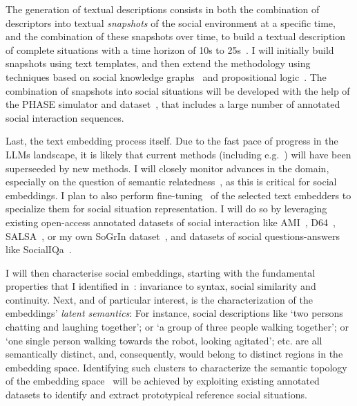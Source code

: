 
The generation of textual descriptions consists in both the combination of
descriptors into textual \emph{snapshots} of the social environment at a
specific time, and the combination of these snapshots over time, to build a
textual description of complete situations with a time horizon of 10s to
25s~\cite{netanyahu2021phase}. I will initially build snapshots using text
templates, and then extend the methodology using techniques based on
social knowledge graphs~\cite{sap2019atomic} and propositional
logic~\cite{tsoi2022sean}. The combination of snapshots into social situations
will be developed with the help of the PHASE simulator and
dataset~\cite{netanyahu2021phase}, that includes a large number of annotated
social interaction sequences.

Last, the text embedding process itself. Due to the fast pace of progress in the
LLMs landscape, it is likely that current
methods (including e.g.~\cite{reimers2019sentencebert,muennighoff2022sgpt}) will
have been superseeded by new methods. I will closely monitor
advances in the domain, especially on the question of semantic
relatedness~\cite{thakur2021beir}, as this is critical for social
embeddings. I plan to also perform fine-tuning~\cite{hadsell2006dimensionality}
of the selected text embedders to specialize them for social situation
representation. I will do so by leveraging existing open-access annotated
datasets of social interaction like AMI~\cite{carletta2007ami},
D64~\cite{oertel2013d64}, SALSA~\cite{alameda2015salsa}, or my own SoGrIn
dataset~\cite{webb2023sogrin}, and datasets of social questions-answers like
SocialIQa~\cite{sap2019social}.

I will then characterise social embeddings, starting with the fundamental
properties that I identified in~\cite{lemaignan2024social}: invariance to
syntax, social similarity and continuity. Next, and of particular interest, is
the characterization of the embeddings' \emph{latent semantics}: For instance,
social descriptions like `two persons chatting and laughing
together'; or `a group of three people walking together'; or `one single person
walking towards the robot, looking agitated'; etc.  are all semantically
distinct, and, consequently, would belong to distinct regions in the embedding
space. Identifying such clusters to characterize the semantic topology of the
embedding space~\cite{sun2023topological} will be achieved by exploiting
existing annotated datasets to identify and extract prototypical reference social situations.


